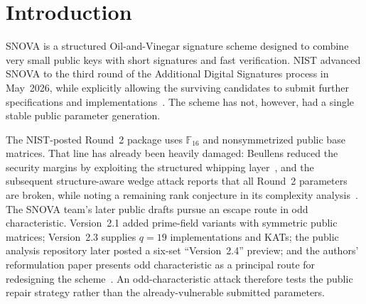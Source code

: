 \documentclass[runningheads]{llncs}
\newcommand{\F}{\mathbb F}
\newcommand{\SNOVA}{\textsf{SNOVA}}
\begin{document}
\begin{abstract}
The algebraic quotient, rejection-rule bypass, and public-key reductions are exact.  The concrete bit costs remain heuristic, as do the corresponding security estimates in the \SNOVA{} materials.  This paper therefore claims a security-category or parameter break of the public odd-characteristic drafts at all three NIST security levels, not a practical full-size forgery; restoring any level requires reparameterization against the corrected rank ceiling $m_1\binom{\ell+1}{2}$.  The attack does not apply to the unsymmetrized $q=16$ public matrices.

\end{abstract}

\section{Introduction}\label{sec:intro}

\SNOVA{} is a structured Oil-and-Vinegar signature scheme designed to combine very small public keys with short signatures and fast verification.  NIST advanced \SNOVA{} to the third round of the Additional Digital Signatures process in May~2026, while explicitly allowing the surviving candidates to submit further specifications and implementations~\cite{NISTIR8610,NISTRound3}.  The scheme has not, however, had a single stable public parameter generation.

The NIST-posted Round~2 package uses $\F_{16}$ and nonsymmetrized public base matrices.  That line has already been heavily damaged: Beullens reduced the security margins by exploiting the structured whipping layer~\cite{Beullens2024SNOVA}, and the subsequent structure-aware wedge attack reports that all Round~2 parameters are broken, while noting a remaining rank conjecture in its complexity analysis~\cite{BrosEtAl2026SNOVAWedge}.  The \SNOVA{} team's later public drafts pursue an escape route in odd characteristic.  Version~2.1 added prime-field variants with symmetric public matrices; Version~2.3 supplies $q=19$ implementations and KATs; the public analysis repository later posted a six-set ``Version~2.4'' preview; and the authors' reformulation paper presents odd characteristic as a principal route for redesigning the scheme~\cite{SNOVA23,SNOVA24Preview,DingEtAl2026Reformulating}.  An odd-characteristic attack therefore tests the public repair strategy rather than the already-vulnerable submitted parameters.
\end{document}
